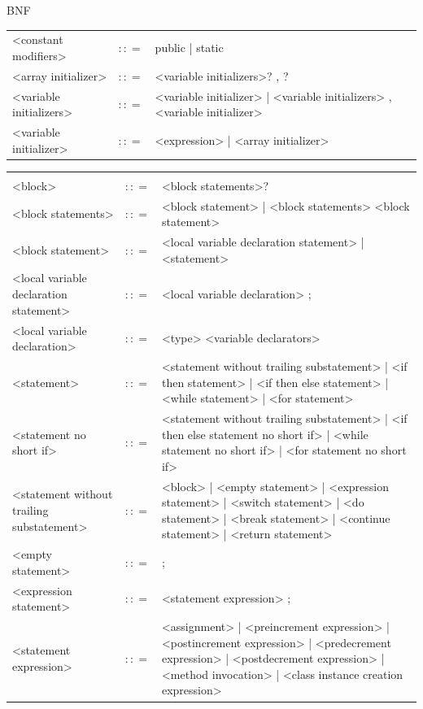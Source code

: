 \documentclass[landscape, 11pt]{article}
\begin{document}
\begin{qsection}{BNF}
\begin{enumerate}[label=\bt{\theenumi.}]
\begin{longtable}{R{7cm} c L{15cm}}
				\\
				<constant modifiers>						&	$\colon\colon=$	&	public | static
				\\
				<array initializer>							&	$\colon\colon=$	&	{ <variable initializers>? , ? }
				\\
				<variable initializers>						&	$\colon\colon=$	&	<variable initializer> | <variable initializers> , <variable initializer>
				\\
				<variable initializer>						&	$\colon\colon=$	&	<expression> | <array initializer>
			\end{longtable}

		\ditem[Types.]

			\begin{longtable}{R{7cm} c L{15cm}}
													&					&	 \\
				<block>										&	$\colon\colon=$	&	{ <block statements>? }
				\\
				<block statements>							&	$\colon\colon=$	&	<block statement> | <block statements> <block statement>
				\\
				<block statement>							&	$\colon\colon=$	&	<local variable declaration statement> | <statement>
				\\
				<local variable declaration statement>		&	$\colon\colon=$	&	<local variable declaration> ;
				\\
				<local variable declaration>				&	$\colon\colon=$	&	<type> <variable declarators>
				\\
				<statement>									&	$\colon\colon=$	&	<statement without trailing substatement> | <if then statement> | <if then else statement> | <while statement> | <for statement>
				\\
				<statement no short if>						&	$\colon\colon=$	&	<statement without trailing substatement> | <if then else statement no short if> | <while statement no short if> | <for statement no short if>
				\\
				<statement without trailing substatement>	&	$\colon\colon=$	&	<block> | <empty statement> | <expression statement> | <switch statement> | <do statement> | <break statement> | <continue statement> | <return statement>
				\\
				<empty statement>							&	$\colon\colon=$	&	;
				\\
				<expression statement>						&	$\colon\colon=$	&	<statement expression> ;
				\\
				<statement expression>						&	$\colon\colon=$	&	<assignment> | <preincrement expression> | <postincrement expression> | <predecrement expression> | <postdecrement expression> | <method invocation> | <class instance creation expression>

\end{longtable}
\end{enumerate}
\end{qsection}
\end{document}
